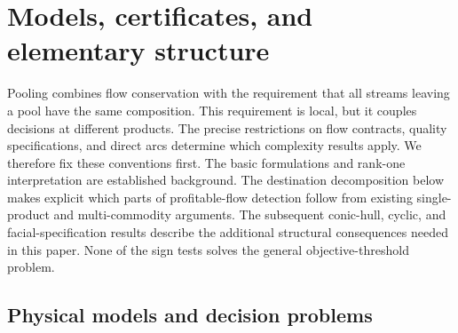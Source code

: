 \section{Models, certificates, and elementary structure}\label{s1:foundations}

Pooling combines flow conservation with the requirement that all streams
leaving a pool have the same composition. This requirement is local, but
it couples decisions at different products. The precise restrictions on
flow contracts, quality specifications, and direct arcs determine which
complexity results apply. We therefore fix these conventions first.
The basic formulations and rank-one interpretation are established
background. The destination decomposition below makes explicit which
parts of profitable-flow detection follow from existing single-product
and multi-commodity arguments. The subsequent conic-hull, cyclic, and
facial-specification results describe the additional structural
consequences needed in this paper. None of the sign tests solves the
general objective-threshold problem.

\subsection{Physical models and decision problems}\label{s1:model}

